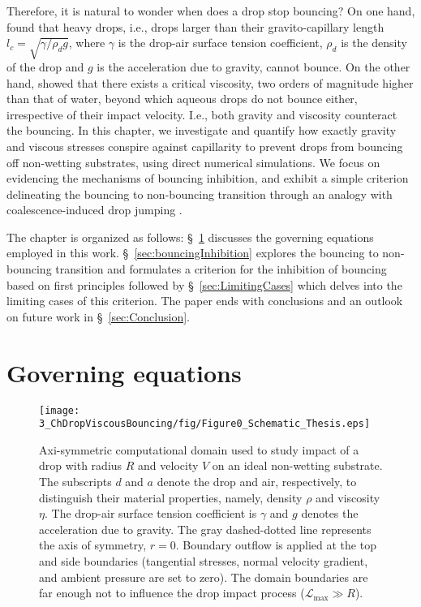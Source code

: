 Therefore, it is natural to wonder when does a drop stop bouncing? On one hand, \citet{biance2006} found that heavy drops, i.e., drops larger than their gravito-capillary length $l_c = \sqrt{\gamma/\rho_dg}$, where $\gamma$ is the drop-air surface tension coefficient, $\rho_d$ is the density of the drop and $g$ is the acceleration due to gravity, cannot bounce.
On the other hand, \citet{jha2020viscous} showed that there exists a critical viscosity, two orders of magnitude higher than that of water, beyond which aqueous drops do not bounce either, irrespective of their impact velocity. I.e., both gravity and viscosity counteract the bouncing. In this chapter, we investigate and quantify how exactly gravity and viscous stresses conspire against capillarity to prevent drops from bouncing off non-wetting substrates, using direct numerical simulations. We focus on evidencing the mechanisms of bouncing inhibition, and exhibit a simple criterion delineating the bouncing to non-bouncing transition through an analogy with coalescence-induced drop jumping \citep{boreyko2009, mouterde2017merging, lecointre2019ballistics}.

The chapter is organized as follows: \S~\ref{sec:method} discusses the governing equations employed in this work. \S~\ref{sec:bouncingInhibition} explores the bouncing to non-bouncing transition and formulates a criterion for the inhibition of bouncing based on first principles followed by \S~\ref{sec:LimitingCases} which delves into the limiting cases of this criterion. The paper ends with conclusions and an outlook on future work in \S~\ref{sec:Conclusion}.  

\section{Governing equations}
\label{sec:method}
\begin{figure}
	\centering
	\texttt{[image: 3\_ChDropViscousBouncing/fig/Figure0\_Schematic\_Thesis.eps]}
	\caption{Axi-symmetric computational domain used to study impact of a drop with radius $R$ and velocity $V$ on an ideal non-wetting substrate. The subscripts $d$ and $a$ denote the drop and air, respectively, to distinguish their material properties, namely, density $\rho$ and viscosity $\eta$. The drop-air surface tension coefficient is $\gamma$ and $g$ denotes the acceleration due to gravity. The gray dashed-dotted line represents the axis of symmetry, $r = 0$. Boundary outflow is applied at the top and side boundaries (tangential stresses, normal velocity gradient, and ambient pressure are set to zero). The domain boundaries are far enough not to influence the drop impact process ($\mathcal{L}_{\text{max}} \gg R$).}
	\label{Ch3::fig:schematic}
\end{figure}

